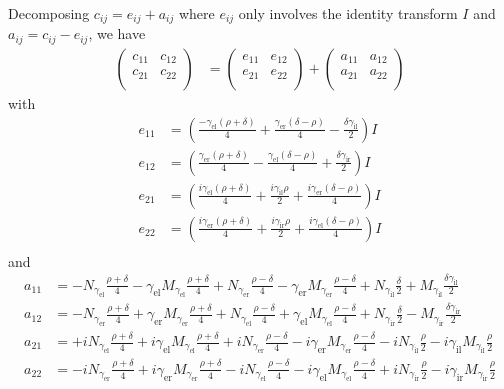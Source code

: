 Decomposing $c_{ij} = e_{ij} + a_{ij}$ where $e_{ij}$ only involves the identity transform $I$ and $a_{ij}=c_{ij}-e_{ij}$, we have
\begin{align*}
  \begin{pmatrix}
    c_{11} & c_{12} \\
    c_{21} & c_{22} \\
  \end{pmatrix} &=
  \begin{pmatrix}
    e_{11} & e_{12} \\
    e_{21} & e_{22} \\
  \end{pmatrix} + 
  \begin{pmatrix}
    a_{11} & a_{12} \\
    a_{21} & a_{22} \\
  \end{pmatrix} 
\end{align*}
with
\begin{align*}
  e_{11} &= \left(\frac{-\gamma_\text{el} (\rho+\delta)}{4}+\frac{\gamma_\text{er} (\delta-\rho)}{4}-\frac{\delta \gamma_\text{il}}{2}\right) I \\
  e_{12} &= \left(\frac{\gamma_\text{er} (\rho+\delta)}{4}-\frac{\gamma_\text{el} (\delta-\rho)}{4}+\frac{\delta \gamma_\text{ir}}{2}\right) I \\
  e_{21} &= \left(\frac{i \gamma_\text{el} (\rho+\delta)}{4}+\frac{i \gamma_\text{il} \rho}{2}+\frac{i \gamma_\text{er} (\delta-\rho)}{4}\right) I\\
  e_{22} &= \left(\frac{i \gamma_\text{er} (\rho+\delta)}{4}+\frac{i \gamma_\text{ir} \rho}{2}+\frac{i \gamma_\text{el} (\delta-\rho)}{4}\right) I\\
\end{align*}
and
\begin{align*}
  a_{11} &= -N_{\gamma_\text{el}} \frac{\rho+\delta}{4}-\gamma_\text{el} M_{\gamma_\text{el}} \frac{\rho+\delta}{4} +N_{\gamma_\text{er}} \frac{\rho-\delta}{4}-\gamma_\text{er} M_{\gamma_\text{er}} \frac{\rho-\delta}{4}+N_{\gamma_\text{il}}\frac{\delta}{2}+M_{\gamma_\text{il}}\frac{\delta \gamma_\text{il}}{2} \\
  a_{12} &= -N_{\gamma_\text{er}} \frac{\rho+\delta}{4} + \gamma_\text{er} M_{\gamma_\text{er}} \frac{\rho+\delta}{4} +N_{\gamma_\text{el}} \frac{\rho-\delta}{4}+\gamma_\text{el} M_{\gamma_\text{el}} \frac{\rho-\delta}{4}+N_{\gamma_\text{ir}}\frac{\delta}{2}-M_{\gamma_\text{ir}}\frac{\delta\gamma_\text{ir}}{2}  \\
  a_{21} &= +i N_{\gamma_\text{el}} \frac{\rho+\delta}{4} +i \gamma_\text{el} M_{\gamma_\text{el}} \frac{\rho+\delta}{4} +i N_{\gamma_\text{er}} \frac{\rho-\delta}{4}-i \gamma_\text{er} M_{\gamma_\text{er}} \frac{\rho-\delta}{4}-i N_{\gamma_\text{il}} \frac{\rho}{2}-i \gamma_\text{il} M_{\gamma_\text{il}} \frac{\rho}{2} \\
  a_{22} &= -i N_{\gamma_\text{er}} \frac{\rho+\delta}{4}+i \gamma_\text{er} M_{\gamma_\text{er}} \frac{\rho+\delta}{4} -i N_{\gamma_\text{el}} \frac{\rho-\delta}{4}-i \gamma_\text{el} M_{\gamma_\text{el}} \frac{\rho-\delta}{4}+i N_{\gamma_\text{ir}} \frac{\rho}{2}-i \gamma_\text{ir} M_{\gamma_\text{ir}} \frac{\rho}{2} \\
\end{align*}
